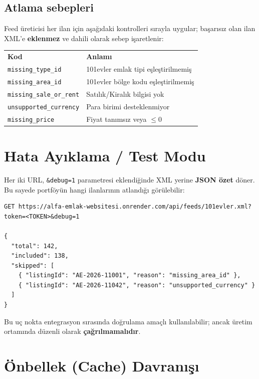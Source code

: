 \documentclass[11pt,a4paper]{article}
\begin{document}
\subsection{Atlama sebepleri}

Feed üreticisi her ilan için aşağıdaki kontrolleri sırayla uygular; başarısız olan ilan XML'e \textbf{eklenmez} ve dahili olarak sebep işaretlenir:

\begin{tabular}{ll}
\textbf{Kod} & \textbf{Anlamı} \\
\texttt{missing\_type\_id} & 101evler emlak tipi eşleştirilmemiş \\
\texttt{missing\_area\_id} & 101evler bölge kodu eşleştirilmemiş \\
\texttt{missing\_sale\_or\_rent} & Satılık/Kiralık bilgisi yok \\
\texttt{unsupported\_currency} & Para birimi desteklenmiyor \\
\texttt{missing\_price} & Fiyat tanımsız veya $\leq 0$ \\
\end{tabular}

\section{Hata Ayıklama / Test Modu}

Her iki URL, \texttt{\&debug=1} parametresi eklendiğinde XML yerine \textbf{JSON özet} döner. Bu sayede portföyün hangi ilanlarının atlandığı görülebilir:

\begin{lstlisting}[style=xmlstyle]
GET https://alfa-emlak-websitesi.onrender.com/api/feeds/101evler.xml?token=<TOKEN>&debug=1

{
  "total": 142,
  "included": 138,
  "skipped": [
    { "listingId": "AE-2026-11001", "reason": "missing_area_id" },
    { "listingId": "AE-2026-11042", "reason": "unsupported_currency" }
  ]
}
\end{lstlisting}

Bu uç nokta entegrasyon sırasında doğrulama amaçlı kullanılabilir; ancak üretim ortamında düzenli olarak \textbf{çağrılmamalıdır}.

\section{Önbellek (Cache) Davranışı}
\end{document}
